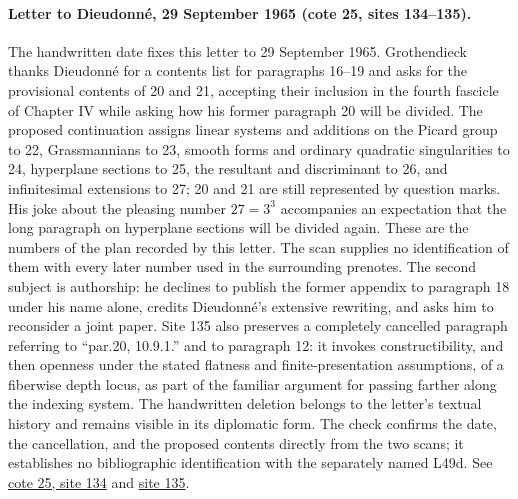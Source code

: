 \paragraph{Letter to Dieudonné, 29 September 1965 (cote 25, sites 134--135).}
The handwritten date fixes this letter to 29 September 1965. Grothendieck thanks Dieudonné for a contents list for paragraphs 16--19 and asks for the provisional contents of 20 and 21, accepting their inclusion in the fourth fascicle of Chapter IV while asking how his former paragraph 20 will be divided. The proposed continuation assigns linear systems and additions on the Picard group to 22, Grassmannians to 23, smooth forms and ordinary quadratic singularities to 24, hyperplane sections to 25, the resultant and discriminant to 26, and infinitesimal extensions to 27; 20 and 21 are still represented by question marks. His joke about the pleasing number $27=3^3$ accompanies an expectation that the long paragraph on hyperplane sections will be divided again. These are the numbers of the plan recorded by this letter. The scan supplies no identification of them with every later number used in the surrounding prenotes. The second subject is authorship: he declines to publish the former appendix to paragraph 18 under his name alone, credits Dieudonné's extensive rewriting, and asks him to reconsider a joint paper. Site 135 also preserves a completely cancelled paragraph referring to ``par.20, 10.9.1.'' and to paragraph 12: it invokes constructibility, and then openness under the stated flatness and finite-presentation assumptions, of a fiberwise depth locus, as part of the familiar argument for passing farther along the indexing system. The handwritten deletion belongs to the letter's textual history and remains visible in its diplomatic form. The check confirms the date, the cancellation, and the proposed contents directly from the two scans; it establishes no bibliographic identification with the separately named L49d. See \href{https://grothendieck.umontpellier.fr/web/viewer.html?file=../25.pdf#page=135}{cote 25, site 134} and \href{https://grothendieck.umontpellier.fr/web/viewer.html?file=../25.pdf#page=136}{site 135}.
